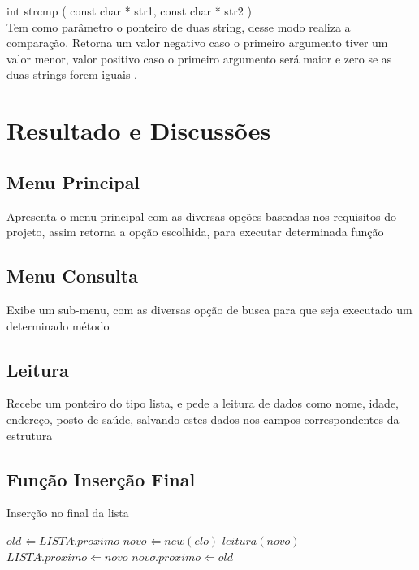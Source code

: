 \documentclass[12pt]{article}
\begin{document}
int strcmp ( const char * str1, const char * str2 )\\

Tem como parâmetro o ponteiro de duas string, desse modo realiza a comparação. Retorna um valor negativo caso o primeiro argumento
tiver um valor menor, valor positivo caso o primeiro argumento será maior e zero se as duas strings forem iguais \cite{kernighan1988c}.



\section{Resultado e Discussões}

\subsection{Menu Principal}

Apresenta o menu principal com as diversas opções baseadas nos requisitos do projeto,
assim retorna a opção escolhida, para executar determinada função 


\subsection{Menu Consulta}

Exibe um sub-menu, com as diversas opção de busca para que seja executado um determinado
método


\subsection{Leitura}

Recebe um ponteiro do tipo lista, e pede a leitura de dados como nome, idade, 
endereço, posto de saúde, salvando estes dados nos campos correspondentes
da estrutura

\subsection{Função Inserção Final}


\begin{algorithm}                      %
\caption{Inserção no final da lista}          %
\label{alg1}                           %
\begin{algorithmic}                    %
    \STATE $old \Leftarrow LISTA\hat.proximo$
    \STATE $novo \Leftarrow new(elo)$
    \STATE $leitura(novo)$
    \STATE $LISTA\hat.proximo \Leftarrow novo$
    \STATE $novo\hat.proximo \Leftarrow old$
\end{algorithmic}
\end{algorithm}
\end{document}

